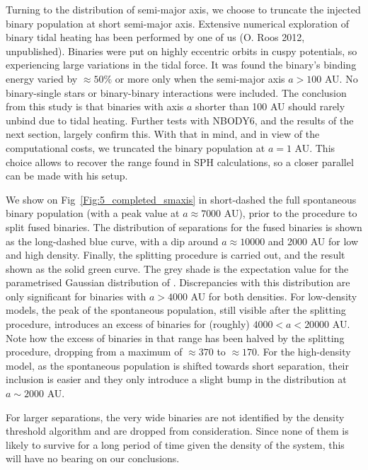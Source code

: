Turning to the distribution of semi-major axis, we choose to truncate the injected binary population at short semi-major axis. Extensive numerical exploration of binary tidal heating has been performed by one of us (O. Roos 2012, unpublished). Binaries were put on highly eccentric orbits in cuspy \cite{Dehnen1993} potentials, so experiencing large variations in the tidal force. It was found the binary's binding energy varied by $ \approx 50\%$ or more only when the semi-major axis $a >  100$ AU. No binary-single stars or binary-binary interactions were included. The conclusion from this study is that binaries with axis $a$ shorter than 100 AU should rarely unbind due to tidal heating. Further tests with NBODY6, and the results of the next section, largely confirm this. With that in mind, and in view of the computational costs, we truncated the binary population at $a = 1$ AU. This choice allows to recover the range found in \cite{Bbate2012} SPH calculations, so a closer parallel can be made with his setup. 


We show on Fig~\ref{Fig:5_completed_smaxis} in short-dashed  the full spontaneous binary population (with a peak value at $a \approx 7 000$ AU), prior to the procedure to split fused binaries. The distribution of separations for the fused binaries is shown as the long-dashed blue curve, with a dip around $ a \approx 10 000$ and 2000 AU for low and high density. Finally, the splitting procedure is carried out, and the result shown as the solid green curve. The grey shade is the expectation value for
the parametrised Gaussian distribution of \cite{raghavan2010}. Discrepancies with this distribution are only significant for binaries with $a > 4 000$ AU for both densities. For low-density models, the peak of the spontaneous population, still visible after the splitting procedure, introduces an excess of binaries for (roughly)  $ 4 000 < a < 20 000 $ AU. Note how the excess of binaries in that range has been halved by the splitting procedure, dropping from a maximum of $\approx 370$ to $ \approx 170$. For the high-density model, as the spontaneous population is shifted towards short separation, their inclusion is easier and they only introduce a slight bump in the distribution at $ a \sim 2 000 $ AU.

 For larger separations, the very wide binaries are not identified by the density threshold algorithm and are dropped from consideration. Since none of them is likely to survive for a long period of time given the density of the system, this will have no bearing on our conclusions. 

